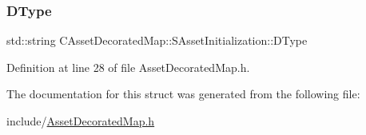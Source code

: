 \hypertarget{structCAssetDecoratedMap_1_1SAssetInitialization_acc1ab65366ed9e00080b71c541f3b72d}{}\label{structCAssetDecoratedMap_1_1SAssetInitialization_acc1ab65366ed9e00080b71c541f3b72d} 
\subsubsection{\texorpdfstring{D\+Type}{DType}}
{\footnotesize\ttfamily std\+::string C\+Asset\+Decorated\+Map\+::\+S\+Asset\+Initialization\+::\+D\+Type}



Definition at line 28 of file Asset\+Decorated\+Map.\+h.



The documentation for this struct was generated from the following file\+:\begin{DoxyCompactItemize}
\item 
include/\hyperlink{AssetDecoratedMap_8h}{Asset\+Decorated\+Map.\+h}\end{DoxyCompactItemize}
